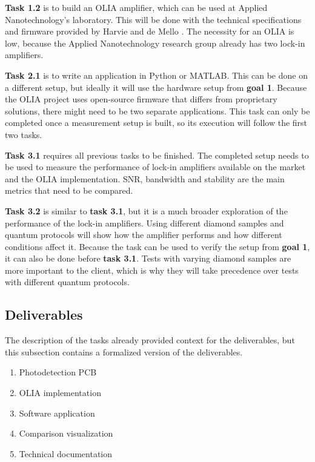 \textbf{Task 1.2} is to build an OLIA amplifier, which can be used at Applied Nanotechnology's laboratory. This will be done with the technical specifications and firmware provided by Harvie and de Mello \cite{harvie2023olia}. The necessity for an OLIA is low, because the Applied Nanotechnology research group already has two lock-in amplifiers.

\textbf{Task 2.1} is to write an application in Python or MATLAB. This can be done on a different setup, but ideally it will use the hardware setup from \textbf{goal 1}. Because the OLIA project uses open-source firmware that differs from proprietary solutions, there might need to be two separate applications. This task can only be completed once a measurement setup is built, so its execution will follow the first two tasks.

\textbf{Task 3.1} requires all previous tasks to be finished. The completed setup needs to be used to measure the performance of lock-in amplifiers available on the market and the OLIA implementation. SNR, bandwidth and stability are the main metrics that need to be compared.

\textbf{Task 3.2} is similar to \textbf{task 3.1}, but it is a much broader exploration of the performance of the lock-in amplifiers. Using different diamond samples and quantum protocols will show how the amplifier performs and how different conditions affect it. Because the task can be used to verify the setup from \textbf{goal 1}, it can also be done before \textbf{task 3.1}. Tests with varying diamond samples are more important to the client, which is why they will take precedence over tests with different quantum protocols.


\subsection{Deliverables}
The description of the tasks already provided context for the deliverables, but this subsection contains a formalized version of the deliverables.

\begin{enumerate}
	\item Photodetection PCB 
	\item OLIA implementation
	\item Software application
	\item Comparison visualization
	\item Technical documentation
\end{enumerate}

